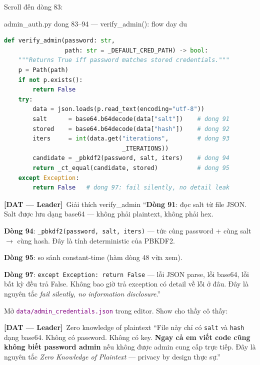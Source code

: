 \documentclass[12pt, a4paper]{article}
\newcommand{\dat}{\textcolor{BrickRed}{\textbf{[DAT --- Leader]}}}
\newcommand{\fpath}[1]{\texttt{\textcolor{purple}{#1}}}
\begin{document}
\begin{action}
Scroll đến dòng 83:
\end{action}

\begin{codestep}{admin\_auth.py dong 83--94 --- verify\_admin(): flow day du}
\begin{lstlisting}[language=Python, firstnumber=83]
def verify_admin(password: str,
                 path: str = _DEFAULT_CRED_PATH) -> bool:
    """Returns True iff password matches stored credentials."""
    p = Path(path)
    if not p.exists():
        return False
    try:
        data = json.loads(p.read_text(encoding="utf-8"))
        salt      = base64.b64decode(data["salt"])    # dong 91
        stored    = base64.b64decode(data["hash"])    # dong 92
        iters     = int(data.get("iterations",        # dong 93
                                 _ITERATIONS))
        candidate = _pbkdf2(password, salt, iters)    # dong 94
        return _ct_equal(candidate, stored)           # dong 95
    except Exception:
        return False   # dong 97: fail silently, no detail leak
\end{lstlisting}
\end{codestep}

\begin{dialog}{\dat\ Giải thích verify\_admin}
``\textbf{Dòng 91}: đọc salt từ file JSON.
Salt được lưu dạng base64 --- không phải plaintext, không phải hex.

\textbf{Dòng 94}: \texttt{\_pbkdf2(password, salt, iters)}
--- tức cùng password + cùng salt $\to$ cùng hash.
Đây là tính deterministic của PBKDF2.

\textbf{Dòng 95}: so sánh constant-time (hàm dòng 48 vừa xem).

\textbf{Dòng 97}: \texttt{except Exception: return False} ---
lỗi JSON parse, lỗi base64, lỗi bất kỳ đều trả False.
Không bao giờ trả exception có detail về lỗi ở đâu.
Đây là nguyên tắc \textit{fail silently, no information disclosure}.''
\end{dialog}

\begin{action}
Mở \fpath{data/admin\_credentials.json} trong editor. Show cho thầy cô thấy:
\end{action}

\begin{dialog}{\dat\ Zero knowledge of plaintext}
``File này chỉ có \texttt{salt} và \texttt{hash} dạng base64.
Không có password. Không có key.
\textbf{Ngay cả em viết code cũng không biết password admin}
nếu không được admin cung cấp trực tiếp.
Đây là nguyên tắc \textit{Zero Knowledge of Plaintext} --- privacy by design thực sự.''
\end{dialog}
\end{document}
